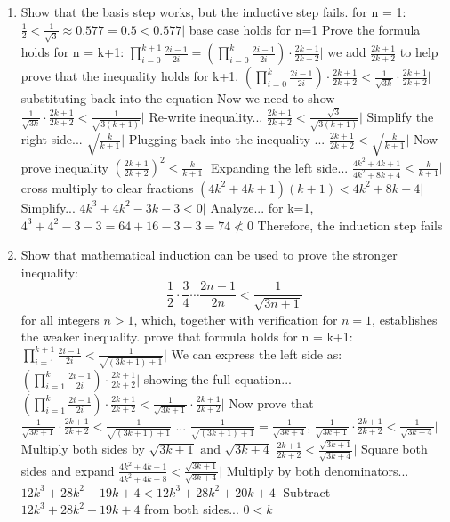 \documentclass{article}
\begin{document}
	\begin{enumerate}
		\item Show that the basis step works, but the inductive step fails.
		\subitem for n = 1:
		\subitem $\frac{1}{2} < \frac{1}{\sqrt{3}} \approx 0.577 = 0.5 < 0.577 |$ base case holds for n=1
		\subitem Prove the formula holds for n = k+1:
		\subitem $\prod_{i=0}^{k+1} \frac{2i-1}{2i} = (\prod_{i=0}^{k} \frac{2i-1}{2i}) \cdot \frac{2k+1}{2k+2} | $ we add $\frac{2k+1}{2k+2}$ to help prove that the inequality holds for k+1.
		\subitem $(\prod_{i=0}^{k} \frac{2i-1}{2i}) \cdot \frac{2k+1}{2k+2} < \frac{1}{\sqrt{3k}} \cdot \frac{2k+1}{2k+2} | $ substituting back into the equation
		\subitem  Now we need to show $\frac{1}{\sqrt{3k}} \cdot \frac{2k+1}{2k+2} < \frac{1}{\sqrt{3(k+1)}} | $ Re-write inequality...
		\subitem  $\frac{2k+1}{2k+2} < \frac{\sqrt{3}}{\sqrt{3(k+1)}} | $ Simplify the right side...
		\subitem $\sqrt{\frac{k}{k+1}} | $ Plugging back into the inequality ...
		\subitem $\frac{2k+1}{2k+2} < \sqrt{\frac{k}{k+1}} | $ Now prove inequality
		\subitem $(\frac{2k+1}{2k+2})^2 < \frac{k}{k+1} | $ Expanding the left side...	
		\subitem $\frac{4k^2+4k+1}{4k^2+8k+4} < \frac{k}{k+1} | $ cross multiply to clear fractions
		\subitem $(4k^2+4k+1)(k+1)<4k^2+8k+4 | $ Simplify...
		\subitem $4k^3+4k^2-3k-3< 0 | $ Analyze...
		\subitem for k=1, $4^3+4^2-3-3 = 64+16-3-3 = 74 \not< 0$
		\subitem Therefore, the induction step fails
		
		\item Show that mathematical induction can be used to prove the stronger inequality:
		\[ \frac{1}{2} \cdot \frac{3}{4} \cdots \frac{2n-1}{2n} < \frac{1}{\sqrt{3n+1}} \]
		for all integers $n > 1$, which, together with verification for $n=1$, establishes the weaker inequality.
		\subitem prove that formula holds for n = k+1:
		\subitem $\prod_{i=1}^{k+1} \frac{2i-1}{2i} < \frac{1}{\sqrt{(3k+1)+1}} | $ We can express the left side as:
		\subitem  $(\prod_{i=1}^{k} \frac{2i-1}{2i}) \cdot \frac{2k+1}{2k+2} | $ showing the full equation...
		\subitem  $(\prod_{i=1}^{k} \frac{2i-1}{2i}) \cdot \frac{2k+1}{2k+2} < \frac{1}{\sqrt{3k+1}} \cdot \frac{2k+1}{2k+2} | $ Now prove that $\frac{1}{\sqrt{3k+1}} \cdot \frac{2k+1}{2k+2} < \frac{1}{\sqrt{(3k+1)+1}} $ ...
		\subitem $\frac{1}{\sqrt{(3k+1)+1}} = \frac{1}{\sqrt{3k+4}}$, 
		\subitem $\frac{1}{\sqrt{3k+1}} \cdot \frac{2k+1}{2k+2} < \frac{1}{\sqrt{3k+4}}  | $ Multiply both sides by $\sqrt{3k+1} \text{ and } \sqrt{3k+4}$ 
		\subitem $\frac{2k+1}{2k+2} < \frac{\sqrt{3k+1}}{\sqrt{3k+4}} | $ Square both sides and expand
		\subitem $\frac{4k^2+4k+1}{4k^2+4k+8} < \frac{\sqrt{3k+1}}{\sqrt{3k+4}} | $ Multiply by both denominators...
		\subitem  \(12k^{3}+28k^{2}+19k+4<12k^{3}+28k^{2}+20k+4 | \) Subtract \(12k^{3}+28k^{2}+19k+4\) from both sides...
		\subitem $0<k$
	\end{enumerate}
	
\end{document}
